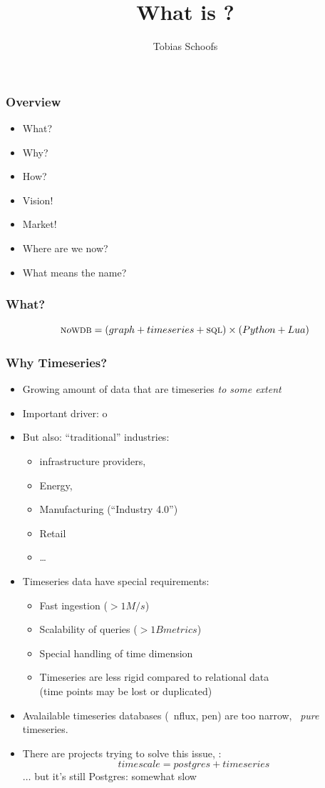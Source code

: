 \documentclass[mathserif,usenames,dvipsnames]{beamer}
\title{What is \nowdb?}
\author{Tobias Schoofs}
\begin{document}
\frame{\titlepage}

\begin{frame}
\frametitle{Overview}
\begin{itemize}
\item What?
\item Why?
\item How?
\item Vision!
\item Market!
\item Where are we now?
\item What means the name?
\end{itemize}
\end{frame}

\begin{frame}
\frametitle{What?}
\begin{equation*}
\textsc{n}o\textsc{wdb} = (graph +  timeseries + \textsc{sql}) \times (Python + Lua)
\end{equation*}
\end{frame}

\begin{frame}[shrink]
\frametitle{Why Timeseries?}
\begin{itemize}
\item Growing amount of data that are timeseries \emph{to some extent}
\item Important driver: o
\item But also: ``traditional'' industries:
      \begin{itemize} 
      \item {} infrastructure providers,
      \item Energy,
      \item Manufacturing (``Industry 4.0'')
      \item Retail
      \item \dots
      \end{itemize}
\item Timeseries data have special requirements:
      \begin{itemize}
      \item Fast ingestion ($> 1M/s$)
      \item Scalability of queries ($> 1B metrics$)
      \item Special handling of time dimension
      \item Timeseries are less rigid compared to relational data\\
            (time points may be lost or duplicated)
      \end{itemize}
\item Avalailable timeseries databases
     (\eg\ nflux, pen) are too narrow, 
      \ie\ \emph{pure} timeseries.
\item There are projects trying to solve this issue,
      \eg: \[
      timescale = postgres + timeseries\]
      $\dots$ but it's still Postgres: somewhat slow
\end{itemize}
\end{frame}
\end{document}
